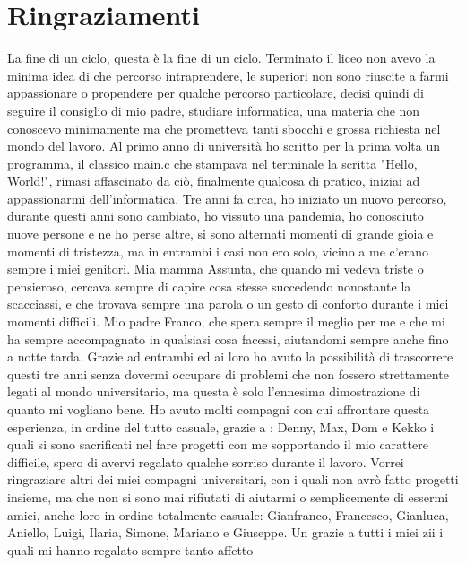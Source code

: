 \chapter*{Ringraziamenti}
La fine di un ciclo, questa è la fine di un ciclo.\newline
Terminato il liceo non avevo la minima idea di che percorso intraprendere, le superiori non sono riuscite a farmi appassionare o propendere per qualche percorso particolare, decisi quindi di seguire il consiglio di mio padre, studiare informatica, una materia che non conoscevo minimamente ma che prometteva tanti sbocchi e grossa richiesta nel mondo del lavoro.\newline
Al primo anno di università ho scritto per la prima volta un programma, il classico main.c che stampava nel terminale la scritta "Hello, World!", rimasi affascinato da ciò, finalmente qualcosa di pratico, iniziai ad appassionarmi dell'informatica.\newline
Tre anni fa circa, ho iniziato un nuovo percorso, durante questi anni sono cambiato, ho vissuto una pandemia, ho conosciuto nuove persone e ne ho perse altre, si sono alternati momenti di grande gioia e momenti di tristezza, ma in entrambi i casi non ero solo, vicino a me c'erano sempre i miei genitori.\newline
Mia mamma Assunta, che quando mi vedeva triste o pensieroso, cercava sempre di capire cosa stesse succedendo nonostante la scacciassi, e che trovava sempre una parola o un gesto di conforto durante i miei momenti difficili.\newline
Mio padre Franco, che spera sempre il meglio per me e che mi ha sempre accompagnato in qualsiasi cosa facessi, aiutandomi sempre anche fino a notte tarda.\newline
Grazie ad entrambi ed ai loro ho avuto la possibilità di trascorrere questi tre anni senza dovermi occupare di problemi che non fossero strettamente legati al mondo universitario, ma questa è solo l'ennesima dimostrazione di quanto mi vogliano bene.\newline
Ho avuto molti compagni con cui affrontare questa esperienza, in ordine del tutto casuale, grazie a : Denny, Max, Dom e Kekko i quali si sono sacrificati nel fare progetti con me sopportando il mio carattere difficile, spero di avervi regalato qualche sorriso durante il lavoro.\newline
Vorrei ringraziare altri dei miei compagni universitari, con i quali non avrò fatto progetti insieme, ma che non si sono mai rifiutati di aiutarmi o semplicemente di essermi amici, anche loro in ordine totalmente casuale: Gianfranco, Francesco, Gianluca, Aniello, Luigi, Ilaria, Simone, Mariano e Giuseppe.\newline
Un grazie a tutti i miei zii i quali mi hanno regalato sempre tanto affetto 